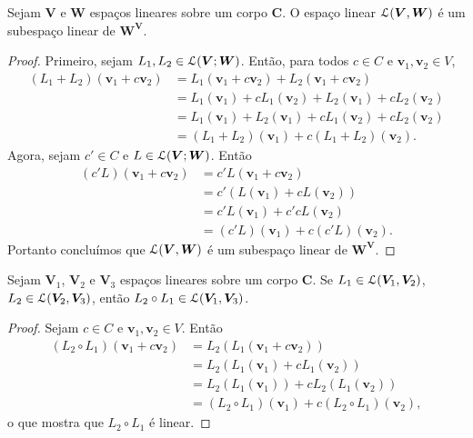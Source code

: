 \begin{proposition}
Sejam $\bm V$ e $\bm W$ espaços lineares sobre um corpo $\bm C$. O espaço linear $\mathcal{L}(\bm V,\bm W)$ é um subespaço linear de $\bm {W^V}$.
\end{proposition}
\begin{proof}
	Primeiro, sejam $L_1,L_2 \in \mathcal{L}(\bm V;\bm W)$. Então, para todos $c \in C$ e $\bm v_1,\bm v_2 \in V$,
	\begin{align*}
	(L_1+L_2)(\bm v_1+c\bm v_2)&=L_1(\bm v_1+c\bm v_2)+L_2(\bm v_1+c\bm v_2) \\
	&=L_1(\bm v_1)+cL_1(\bm v_2)+L_2(\bm v_1)+cL_2(\bm v_2) \\
	&=L_1(\bm v_1)+L_2(\bm v_1)+cL_1(\bm v_2)+cL_2(\bm v_2) \\
	&=(L_1+L_2)(\bm v_1)+c(L_1+L_2)(\bm v_2).
	\end{align*}
	Agora, sejam $c' \in C$ e $L \in \mathcal{L}(\bm V;\bm W)$. Então
	\begin{align*}
	(c'L)(\bm v_1+c\bm v_2)&=c'L(\bm v_1+c\bm v_2) \\
	&=c'(L(\bm v_1)+cL(\bm v_2)) \\
	&= c'L(\bm v_1)+c'cL(\bm v_2) \\
	&= (c'L)(\bm v_1)+c(c'L)(\bm v_2).
	\end{align*}
Portanto concluímos que $\mathcal{L}(\bm V,\bm W)$ é um subespaço linear de $\bm {W^V}$.
\end{proof}

\begin{proposition}
Sejam $\bm V_1$, $\bm V_2$ e $\bm V_3$ espaços lineares sobre um corpo $\bm C$. Se $L_1 \in \mathcal{L}(\bm V_1,\bm V_2)$, $L_2 \in \mathcal{L}(\bm V_2,\bm V_3)$, então $L_2 \circ L_1 \in \mathcal{L}(\bm V_1,\bm V_3)$.
\end{proposition}
\begin{proof}
	Sejam $c \in C$ e $\bm v_1,\bm v_2 \in V$. Então
	\begin{align*}
	(L_2 \circ L_1)(\bm v_1+c\bm v_2) &= L_2(L_1(\bm v_1+c\bm v_2)) \\
	&=L_2(L_1(\bm v_1)+cL_1(\bm v_2)) \\
	&=L_2(L_1(\bm v_1))+cL_2(L_1(\bm v_2)) \\
	&= (L_2 \circ L_1)(\bm v_1)+c(L_2 \circ L_1)(\bm v_2),
	\end{align*}
o que mostra que $L_2 \circ L_1$ é linear.
\end{proof}

